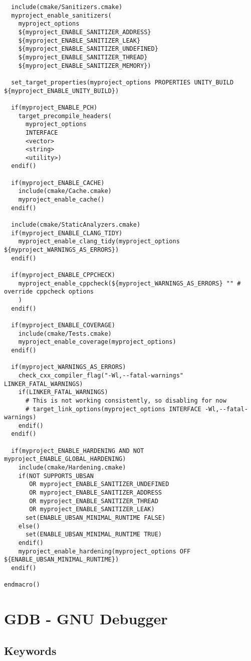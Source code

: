 \documentclass[openany]{report}
\begin{document}
\begin{verbatim}
  include(cmake/Sanitizers.cmake)
  myproject_enable_sanitizers(
    myproject_options
    ${myproject_ENABLE_SANITIZER_ADDRESS}
    ${myproject_ENABLE_SANITIZER_LEAK}
    ${myproject_ENABLE_SANITIZER_UNDEFINED}
    ${myproject_ENABLE_SANITIZER_THREAD}
    ${myproject_ENABLE_SANITIZER_MEMORY})

  set_target_properties(myproject_options PROPERTIES UNITY_BUILD ${myproject_ENABLE_UNITY_BUILD})

  if(myproject_ENABLE_PCH)
    target_precompile_headers(
      myproject_options
      INTERFACE
      <vector>
      <string>
      <utility>)
  endif()

  if(myproject_ENABLE_CACHE)
    include(cmake/Cache.cmake)
    myproject_enable_cache()
  endif()

  include(cmake/StaticAnalyzers.cmake)
  if(myproject_ENABLE_CLANG_TIDY)
    myproject_enable_clang_tidy(myproject_options ${myproject_WARNINGS_AS_ERRORS})
  endif()

  if(myproject_ENABLE_CPPCHECK)
    myproject_enable_cppcheck(${myproject_WARNINGS_AS_ERRORS} "" # override cppcheck options
    )
  endif()

  if(myproject_ENABLE_COVERAGE)
    include(cmake/Tests.cmake)
    myproject_enable_coverage(myproject_options)
  endif()

  if(myproject_WARNINGS_AS_ERRORS)
    check_cxx_compiler_flag("-Wl,--fatal-warnings" LINKER_FATAL_WARNINGS)
    if(LINKER_FATAL_WARNINGS)
      # This is not working consistently, so disabling for now
      # target_link_options(myproject_options INTERFACE -Wl,--fatal-warnings)
    endif()
  endif()

  if(myproject_ENABLE_HARDENING AND NOT myproject_ENABLE_GLOBAL_HARDENING)
    include(cmake/Hardening.cmake)
    if(NOT SUPPORTS_UBSAN 
       OR myproject_ENABLE_SANITIZER_UNDEFINED
       OR myproject_ENABLE_SANITIZER_ADDRESS
       OR myproject_ENABLE_SANITIZER_THREAD
       OR myproject_ENABLE_SANITIZER_LEAK)
      set(ENABLE_UBSAN_MINIMAL_RUNTIME FALSE)
    else()
      set(ENABLE_UBSAN_MINIMAL_RUNTIME TRUE)
    endif()
    myproject_enable_hardening(myproject_options OFF ${ENABLE_UBSAN_MINIMAL_RUNTIME})
  endif()

endmacro()
\end{verbatim}
\chapter{GDB - GNU Debugger}

\section{Keywords}
\end{document}
